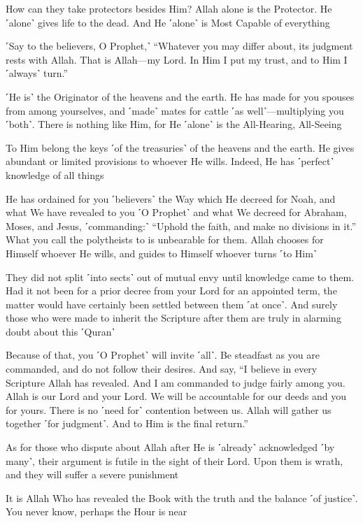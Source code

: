 How can they take protectors besides Him? Allah alone is the Protector. He ˹alone˺ gives life to the dead. And He ˹alone˺ is Most Capable of everything

˹Say to the believers, O Prophet,˺ “Whatever you may differ about, its judgment rests with Allah. That is Allah—my Lord. In Him I put my trust, and to Him I ˹always˺ turn.”

˹He is˺ the Originator of the heavens and the earth. He has made for you spouses from among yourselves, and ˹made˺ mates for cattle ˹as well˺—multiplying you ˹both˺. There is nothing like Him, for He ˹alone˺ is the All-Hearing, All-Seeing

To Him belong the keys ˹of the treasuries˺ of the heavens and the earth. He gives abundant or limited provisions to whoever He wills. Indeed, He has ˹perfect˺ knowledge of all things

He has ordained for you ˹believers˺ the Way which He decreed for Noah, and what We have revealed to you ˹O Prophet˺ and what We decreed for Abraham, Moses, and Jesus, ˹commanding:˺ “Uphold the faith, and make no divisions in it.” What you call the polytheists to is unbearable for them. Allah chooses for Himself whoever He wills, and guides to Himself whoever turns ˹to Him˺

They did not split ˹into sects˺ out of mutual envy until knowledge came to them. Had it not been for a prior decree from your Lord for an appointed term, the matter would have certainly been settled between them ˹at once˺. And surely those who were made to inherit the Scripture after them are truly in alarming doubt about this ˹Quran˺

Because of that, you ˹O Prophet˺ will invite ˹all˺. Be steadfast as you are commanded, and do not follow their desires. And say, “I believe in every Scripture Allah has revealed. And I am commanded to judge fairly among you. Allah is our Lord and your Lord. We will be accountable for our deeds and you for yours. There is no ˹need for˺ contention between us. Allah will gather us together ˹for judgment˺. And to Him is the final return.”

As for those who dispute about Allah after He is ˹already˺ acknowledged ˹by many˺, their argument is futile in the sight of their Lord. Upon them is wrath, and they will suffer a severe punishment

It is Allah Who has revealed the Book with the truth and the balance ˹of justice˺. You never know, perhaps the Hour is near

